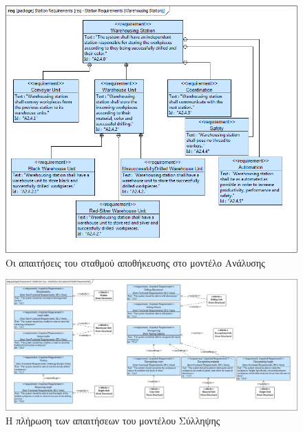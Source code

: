 \documentclass[a4paper,12pt,twoside]{report}
\begin{document}
{\begin{appendices}
			\begin{figure}[hp]
					\centering
					\includegraphics[scale=0.30]{AnalysisModel_req-StationRequirements(WarehousingStation).png}
					\caption{Οι απαιτήσεις του σταθμού αποθήκευσης στο μοντέλο Ανάλυσης}
					\label{φωτ:Οι απαιτήσεις του σταθμού αποθήκευσης στο μοντέλο Ανάλυσης}
			\end{figure}
			
			\begin{figure}[hp]
					\centering
					\includegraphics[scale=0.20]{AnalysisModel_req-Satisfaction(ConceptionalModelsRequirements).png}
					\caption{Η πλήρωση των απαιτήσεων του μοντέλου Σύλληψης}
					\label{φωτ:Η πλήρωση των απαιτήσεων του μοντέλου Σύλληψης}
			\end{figure}
			

\end{appendices}}
\end{document}

